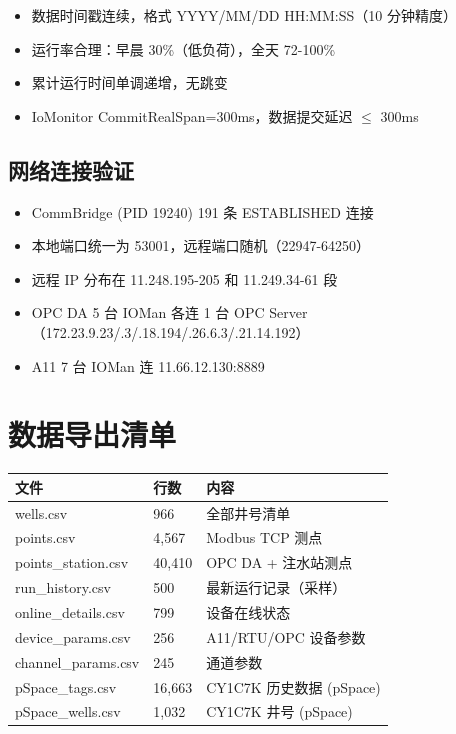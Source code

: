 \documentclass[12pt,a4paper]{ctexart}
\begin{document}
\begin{itemize}[leftmargin=*]
  \item 数据时间戳连续，格式 YYYY/MM/DD HH:MM:SS（10 分钟精度）
  \item 运行率合理：早晨 30\%（低负荷），全天 72-100\%
  \item 累计运行时间单调递增，无跳变
  \item IoMonitor CommitRealSpan=300ms，数据提交延迟 $\leq$ 300ms
\end{itemize}

\subsection{网络连接验证}

\begin{itemize}[leftmargin=*]
  \item CommBridge (PID 19240) 191 条 ESTABLISHED 连接
  \item 本地端口统一为 53001，远程端口随机（22947-64250）
  \item 远程 IP 分布在 11.248.195-205 和 11.249.34-61 段
  \item OPC DA 5 台 IOMan 各连 1 台 OPC Server（172.23.9.23/.3/.18.194/.26.6.3/.21.14.192）
  \item A11 7 台 IOMan 连 11.66.12.130:8889
\end{itemize}

\section{数据导出清单}

\begin{longtable}{p{5cm}p{2.5cm}p{5.5cm}}
\toprule
\textbf{文件} & \textbf{行数} & \textbf{内容} \\
\midrule
wells.csv & 966 & 全部井号清单 \\
points.csv & 4,567 & Modbus TCP 测点 \\
points\_station.csv & 40,410 & OPC DA + 注水站测点 \\
run\_history.csv & 500 & 最新运行记录（采样） \\
online\_details.csv & 799 & 设备在线状态 \\
device\_params.csv & 256 & A11/RTU/OPC 设备参数 \\
channel\_params.csv & 245 & 通道参数 \\
pSpace\_tags.csv & 16,663 & CY1C7K 历史数据 (pSpace) \\
pSpace\_wells.csv & 1,032 & CY1C7K 井号 (pSpace) \\
\bottomrule
\end{longtable}
\end{document}
